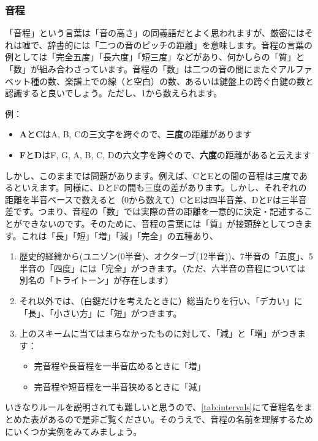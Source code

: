 \documentclass[11pt]{ltjarticle}
\begin{document}
\subsubsection{音程}
「音程」という言葉は「音の高さ」の同義語だとよく思われますが、厳密にはそれは嘘で、辞書的には「二つの音のピッチの距離」を意味します。音程の言葉の例としては「完全五度」「長六度」「短三度」などがあり、何かしらの「質」と「数」が組み合わさっています。音程の「数」は二つの音の間にまたぐアルファベット種の数、楽譜上での線（と空白）の数、あるいは鍵盤上の跨ぐ白鍵の数と認識すると良いでしょう。ただし、1から数えられます。\par
例：
\begin{itemize}
    \item \textbf{A}と\textbf{C}はA, B, Cの三文字を跨ぐので、\textbf{三度}の距離があります
    \item \textbf{F}\sh と\textbf{D}\sh はF, G, A, B, C, Dの六文字を跨ぐので、\textbf{六度}の距離があると云えます
\end{itemize}\par
しかし、このままでは問題があります。例えば、CとEとの間の音程は三度であるといえます。同様に、DとFの間も三度の差があります。しかし、それぞれの距離を半音ベースで数えると（0から数えて）CとEは四半音差、DとFは三半音差です。つまり、音程の「数」では実際の音の距離を一意的に決定・記述することができないのです。そのために、音程の言葉には「質」が接頭辞としてつきます。これは「長」「短」「増」「減」「完全」の五種あり、
\begin{enumerate}
    \item 歴史的経緯から(ユニゾン(0半音)、オクターブ(12半音))、7半音の「五度」、5半音の「四度」には「完全」がつきます。（ただ、六半音の音程については別名の「トライトーン」が存在します）
    \item それ以外では、（白鍵だけを考えたときに）総当たりを行い、「デカい」に「長」、「小さい方」に「短」がつきます。
    \item 上のスキームに当てはまらなかったものに対して、「減」と「増」がつきます：
    \begin{itemize}
        \item 完音程や長音程を一半音広めるときに「増」
        \item 完音程や短音程を一半音狭めるときに「減」
    \end{itemize}
\end{enumerate}
いきなりルールを説明されても難しいと思うので、\autoref{tab:intervals}にて音程名をまとめた表があるので是非ご覧ください。そのうえで、音程の名前を理解するためにいくつか実例をみてみましょう。
\end{document}

